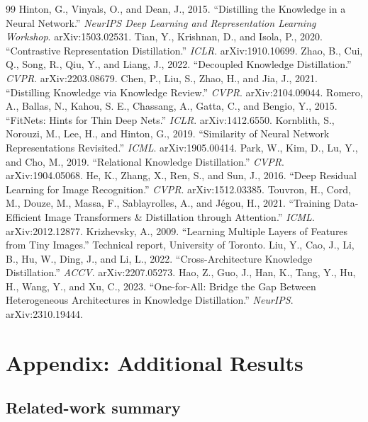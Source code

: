 \documentclass[11pt, letterpaper]{article}
\begin{document}
\begin{thebibliography}{99}
   Hinton, G., Vinyals, O., and Dean, J., 2015. ``Distilling the Knowledge in a Neural Network.'' \textit{NeurIPS Deep Learning and Representation Learning Workshop}. arXiv:1503.02531.
   Tian, Y., Krishnan, D., and Isola, P., 2020. ``Contrastive Representation Distillation.'' \textit{ICLR}. arXiv:1910.10699.
   Zhao, B., Cui, Q., Song, R., Qiu, Y., and Liang, J., 2022. ``Decoupled Knowledge Distillation.'' \textit{CVPR}. arXiv:2203.08679.
   Chen, P., Liu, S., Zhao, H., and Jia, J., 2021. ``Distilling Knowledge via Knowledge Review.'' \textit{CVPR}. arXiv:2104.09044.
   Romero, A., Ballas, N., Kahou, S. E., Chassang, A., Gatta, C., and Bengio, Y., 2015. ``FitNets: Hints for Thin Deep Nets.'' \textit{ICLR}. arXiv:1412.6550.
   Kornblith, S., Norouzi, M., Lee, H., and Hinton, G., 2019. ``Similarity of Neural Network Representations Revisited.'' \textit{ICML}. arXiv:1905.00414.
   Park, W., Kim, D., Lu, Y., and Cho, M., 2019. ``Relational Knowledge Distillation.'' \textit{CVPR}. arXiv:1904.05068.
   He, K., Zhang, X., Ren, S., and Sun, J., 2016. ``Deep Residual Learning for Image Recognition.'' \textit{CVPR}. arXiv:1512.03385.
   Touvron, H., Cord, M., Douze, M., Massa, F., Sablayrolles, A., and J\'egou, H., 2021. ``Training Data-Efficient Image Transformers \& Distillation through Attention.'' \textit{ICML}. arXiv:2012.12877.
   Krizhevsky, A., 2009. ``Learning Multiple Layers of Features from Tiny Images.'' Technical report, University of Toronto.
   Liu, Y., Cao, J., Li, B., Hu, W., Ding, J., and Li, L., 2022. ``Cross-Architecture Knowledge Distillation.'' \textit{ACCV}. arXiv:2207.05273.
   Hao, Z., Guo, J., Han, K., Tang, Y., Hu, H., Wang, Y., and Xu, C., 2023. ``One-for-All: Bridge the Gap Between Heterogeneous Architectures in Knowledge Distillation.'' \textit{NeurIPS}. arXiv:2310.19444.
\end{thebibliography}

\clearpage
\appendix

\section{Appendix: Additional Results}

\subsection{Related-work summary}
\label{app:relwork}
\end{document}
